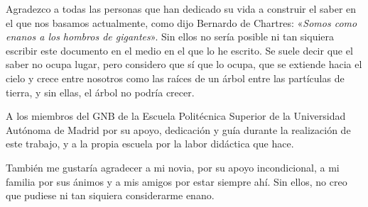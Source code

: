
Agradezco a todas las personas que han dedicado su vida a construir el saber en el que nos basamos actualmente, como dijo Bernardo de Chartres: «\textit{Somos como enanos a los hombros de gigantes}». Sin ellos no sería posible ni tan siquiera escribir este documento en el medio en el que lo he escrito. Se suele decir que el saber no ocupa lugar, pero considero que sí que lo ocupa, que se extiende hacia el cielo y crece entre nosotros como las raíces de un árbol entre las partículas de tierra, y sin ellas, el árbol no podría crecer.

A los miembros del GNB de la Escuela Politécnica Superior de la Universidad Autónoma de Madrid por su apoyo, dedicación y guía durante la realización de este trabajo, y a la propia escuela por la labor didáctica que hace.

También me gustaría agradecer a mi novia, por su apoyo incondicional, a mi familia por sus ánimos y a mis amigos por estar siempre ahí. Sin ellos, no creo que pudiese ni tan siquiera considerarme enano.

